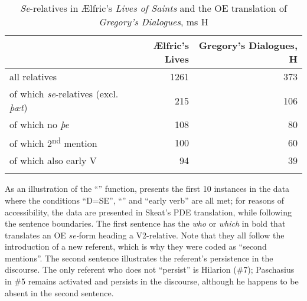 \documentclass[output=paper,colorlinks,citecolor=brown]{langscibook}
\begin{document}
\begin{table}
\begin{tabularx}{0.85\textwidth}{lrr} 
\lsptoprule
& \multicolumn{1}{Q}{{Ælfric's} {Lives}} & \multicolumn{1}{Q}{Gregory's Dialogues, H}\\
\midrule
{all relatives} & {1261} & {373}\\
{of which \textit{se}{}-relatives (excl. \textit{þæt})} & {215} & {106}\\
{of which no \textit{þe}} & {108} & {80}\\
{of which 2\textsuperscript{nd} mention} & {100} & {60}\\
{of which also early V} & {94} & {39}\\
\lspbottomrule
\end{tabularx}
\caption{\textit{Se}-relatives in Ælfric's \textit{Lives of Saints} and the OE translation of \textit{Gregory's Dialogues}, ms H}
\label{tab:los:2}
\end{table}

As an illustration of the “” function,  presents the first 10 instances in the data where the conditions “D=SE”, “” and “early verb” are all met; for reasons of accessibility, the data are presented in Skeat's PDE translation, while following the  sentence boundaries. The first sentence has the \textit{who} or \textit{which} in bold that translates an OE \textit{se-}form heading a V2-relative. Note that they all follow the introduction of a new referent, which is why they were coded as “second mentions”. The second sentence illustrates the referent's persistence in the discourse. The only referent who does not “persist” is Hilarion (\#7); Paschasius in \#5 remains activated and persists in the discourse, although he happens to be absent in the second sentence. 
\end{document}
